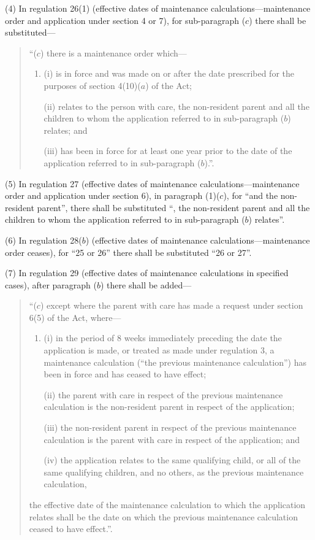 \documentclass[12pt,a4paper]{article}
\begin{document}
(4) In regulation 26(1) (effective dates of maintenance calculations—\hspace{0pt}maintenance order and application under section 4 or 7), for sub-paragraph ($c$)  there shall be substituted—
\begin{quotation}
“($c$) there is a maintenance order which—
\begin{enumerate}\item[]
(i) is in force and was made on or after the date prescribed for the purposes of section 4(10)($a$)  of the Act;

(ii) relates to the person with care, the non-resident parent and all the children to whom the application referred to in sub-paragraph ($b$)  relates; and

(iii) has been in force for at least one year prior to the date of the application referred to in sub-paragraph ($b$).”.
\end{enumerate}
\end{quotation}

(5) In regulation 27 (effective dates of maintenance calculations—\hspace{0pt}maintenance order and application under section 6), in paragraph (1)($c$), for “and the non-resident parent”, there shall be substituted “, the non-resident parent and all the children to whom the application referred to in sub-paragraph ($b$)  relates”.

(6) In regulation 28($b$)  (effective dates of maintenance calculations—\hspace{0pt}maintenance order ceases), for “25 or 26” there shall be substituted “26 or 27”.

(7) In regulation 29 (effective dates of maintenance calculations in specified cases), after paragraph ($b$)  there shall be added—
\begin{quotation}
“($c$) except where the parent with care has made a request under section 6(5) of the Act, where—
\begin{enumerate}\item[]
(i) in the period of 8 weeks immediately preceding the date the application is made, or treated as made under regulation 3, a maintenance calculation (“the previous maintenance calculation”) has been in force and has ceased to have effect;

(ii) the parent with care in respect of the previous maintenance calculation is the non-resident parent in respect of the application;

(iii) the non-resident parent in respect of the previous maintenance calculation is the parent with care in respect of the application; and

(iv) the application relates to the same qualifying child, or all of the same qualifying children, and no others, as the previous maintenance calculation,
\end{enumerate}
the effective date of the maintenance calculation to which the application relates shall be the date on which the previous maintenance calculation ceased to have effect.”.
\end{quotation}
\end{document}
